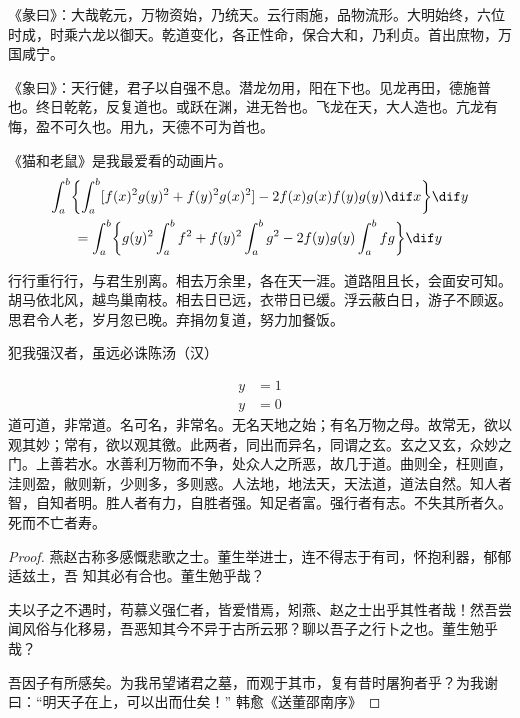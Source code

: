 \documentclass[../Main/thesis.tex]{subfiles}
\begin{document}
《彖曰》：大哉乾元，万物资始，乃统天。云行雨施，品物流形。大明始终，六位时成，时乘六龙以御天。乾道变化，各正性命，保合大和，乃利贞。首出庶物，万国咸宁。

《象曰》：天行健，君子以自强不息。潜龙勿用，阳在下也。见龙再田，德施普也。终日乾乾，反复道也。或跃在渊，进无咎也。飞龙在天，大人造也。亢龙有悔，盈不可久也。用九，天德不可为首也。

\begin{lemma}
  《猫和老鼠》是我最爱看的动画片。
  \begin{multline*}%
    \int_a^b\biggl\{\int_a^b[f(x)^2g(y)^2+f(y)^2g(x)^2]
    -2f(x)g(x)f(y)g(y)\dif x\biggr\}\dif y \\
    =\int_a^b\biggl\{g(y)^2\int_a^bf^2+f(y)^2
    \int_a^b g^2-2f(y)g(y)\int_a^b fg\biggr\}\dif y
  \end{multline*}
\end{lemma}

行行重行行，与君生别离。相去万余里，各在天一涯。道路阻且长，会面安可知。胡马依北风，越鸟巢南枝。相去日已远，衣带日已缓。浮云蔽白日，游子不顾返。思君令人老，岁月忽已晚。弃捐勿复道，努力加餐饭。

\begin{theorem}\label{the:theorem1}
  犯我强汉者，虽远必诛\hfill \pozhehao 陈汤（汉）
\end{theorem}
\begin{subequations}
  \begin{align}
    y & = 1 \\
    y & = 0
  \end{align}
\end{subequations}
道可道，非常道。名可名，非常名。无名天地之始；有名万物之母。故常无，欲以观其妙；常有，欲以观其徼。此两者，同出而异名，同谓之玄。玄之又玄，众妙之门。上善若水。水善利万物而不争，处众人之所恶，故几于道。曲则全，枉则直，洼则盈，敝则新，少则多，多则惑。人法地，地法天，天法道，道法自然。知人者智，自知者明。胜人者有力，自胜者强。知足者富。强行者有志。不失其所者久。死而不亡者寿。

\begin{proof}
  燕赵古称多感慨悲歌之士。董生举进士，连不得志于有司，怀抱利器，郁郁适兹土，吾  知其必有合也。董生勉乎哉？

  夫以子之不遇时，苟慕义强仁者，皆爱惜焉，矧燕、赵之士出乎其性者哉！然吾尝闻风俗与化移易，吾恶知其今不异于古所云邪？聊以吾子之行卜之也。董生勉乎哉？

  吾因子有所感矣。为我吊望诸君之墓，而观于其市，复有昔时屠狗者乎？为我谢曰：“明天子在上，可以出而仕矣！” \hfill\pozhehao 韩愈《送董邵南序》
\end{proof}
\end{document}
